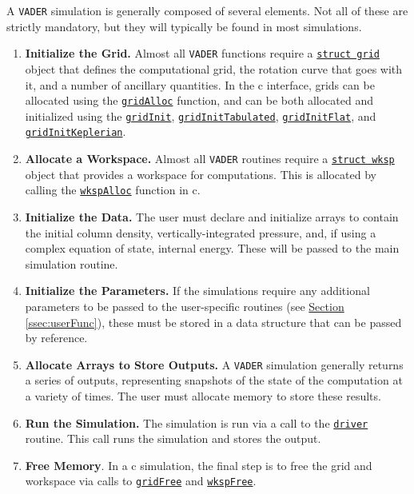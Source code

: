 \documentclass[12pt]{article}
\begin{document}
A \texttt{VADER} simulation is generally composed of several elements. Not all of these are strictly mandatory, but they will typically be found in most simulations.
\begin{enumerate}
\item \textbf{Initialize the Grid.} Almost all \texttt{VADER} functions require a \hyperref[sssec:datastructures]{\texttt{struct grid}} object that defines the computational grid, the rotation curve that goes with it, and a number of ancillary quantities. In the c interface, grids can be allocated using the \hyperref[sssec:gridAlloc]{\texttt{gridAlloc}} function, and can be both allocated and initialized using the \hyperref[sssec:gridInit]{\texttt{gridInit}}, \hyperref[sssec:gridInitTabulated]{\texttt{gridInitTabulated}}, \hyperref[sssec:gridInitFlat]{\texttt{gridInitFlat}}, and \hyperref[sssec:gridInitKeplerian]{\texttt{gridInitKeplerian}}.
\item \textbf{Allocate a Workspace.} Almost all \texttt{VADER} routines require a \hyperref[sssec:datastructures]{\texttt{struct wksp}} object that provides a workspace for computations. This is allocated by calling the \hyperref[sssec:wkspAlloc]{\texttt{wkspAlloc}} function in c.
\item \textbf{Initialize the Data.} The user must declare and initialize arrays to contain the initial column density, vertically-integrated pressure, and, if using a complex equation of state, internal energy. These will be passed to the main simulation routine.
\item \textbf{Initialize the Parameters.} If the simulations require any additional parameters to be passed to the user-specific routines (see \hyperref[ssec:userFunc]{Section \ref{ssec:userFunc}}), these must be stored in a data structure that can be passed by reference.
\item \textbf{Allocate Arrays to Store Outputs.} A \texttt{VADER} simulation generally returns a series of outputs, representing snapshots of the state of the computation at a variety of times. The user must allocate memory to store these results.
\item \textbf{Run the Simulation.} The simulation is run via a call to the \hyperref[sssec:driver]{\texttt{driver}} routine. This call runs the simulation and stores the output.
\item \textbf{Free Memory}. In a c simulation, the final step is to free the grid and workspace via calls to \hyperref[sssec:gridFree]{\texttt{gridFree}} and \hyperref[sssec:wkspFree]{\texttt{wkspFree}}.
\end{enumerate}
\end{document}

